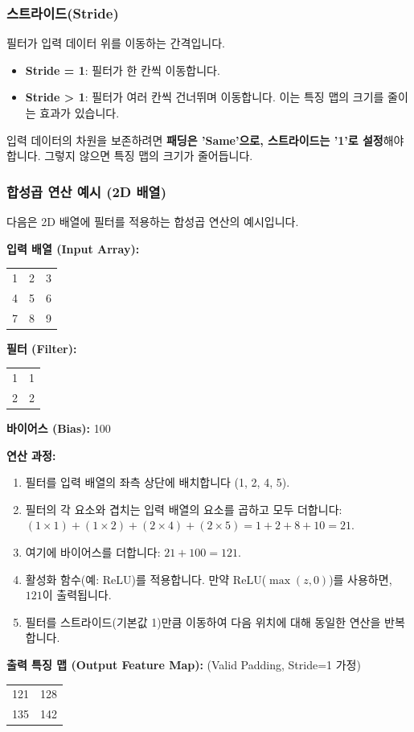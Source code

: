 \documentclass[11pt,a4paper]{article}
\begin{document}
\subsubsection{스트라이드(Stride)}
필터가 입력 데이터 위를 이동하는 간격입니다.
\begin{itemize}
    \item \textbf{Stride = 1}: 필터가 한 칸씩 이동합니다.
    \item \textbf{Stride > 1}: 필터가 여러 칸씩 건너뛰며 이동합니다. 이는 특징 맵의 크기를 줄이는 효과가 있습니다.
\end{itemize}
\begin{warningbox}
입력 데이터의 차원을 보존하려면 \textbf{패딩은 'Same'으로, 스트라이드는 '1'로 설정}해야 합니다. 그렇지 않으면 특징 맵의 크기가 줄어듭니다.
\end{warningbox}

\subsubsection{합성곱 연산 예시 (2D 배열)}
다음은 2D 배열에 필터를 적용하는 합성곱 연산의 예시입니다.

\begin{examplebox}
\textbf{입력 배열 (Input Array):}
\begin{tabular}{ccc}
\toprule
1 & 2 & 3 \\
4 & 5 & 6 \\
7 & 8 & 9 \\
\bottomrule
\end{tabular}

\textbf{필터 (Filter):}
\begin{tabular}{cc}
\toprule
1 & 1 \\
2 & 2 \\
\bottomrule
\end{tabular}
\textbf{바이어스 (Bias):} 100

\textbf{연산 과정:}
\begin{enumerate}
    \item 필터를 입력 배열의 좌측 상단에 배치합니다 (1, 2, 4, 5).
    \item 필터의 각 요소와 겹치는 입력 배열의 요소를 곱하고 모두 더합니다: $(1 \times 1) + (1 \times 2) + (2 \times 4) + (2 \times 5) = 1 + 2 + 8 + 10 = 21$.
    \item 여기에 바이어스를 더합니다: $21 + 100 = 121$.
    \item 활성화 함수(예: ReLU)를 적용합니다. 만약 ReLU($\max(z, 0)$)를 사용하면, $121$이 출력됩니다.
    \item 필터를 스트라이드(기본값 1)만큼 이동하여 다음 위치에 대해 동일한 연산을 반복합니다.
\end{enumerate}
\textbf{출력 특징 맵 (Output Feature Map):} (Valid Padding, Stride=1 가정)
\begin{tabular}{cc}
\toprule
121 & 128 \\
135 & 142 \\
\bottomrule
\end{tabular}
\end{examplebox}
\end{document}
